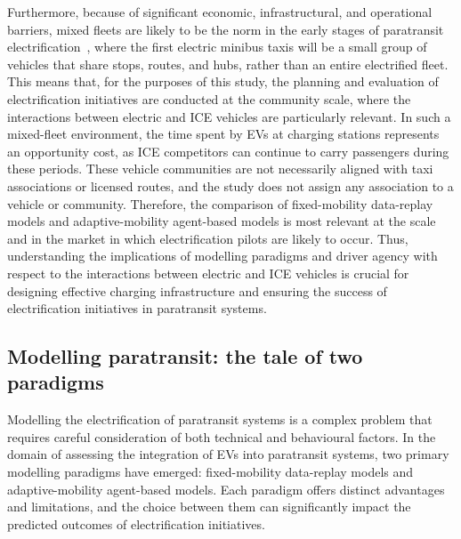 \documentclass{elsarticle}
\begin{document}
Furthermore, because of significant economic, infrastructural, and operational barriers, mixed fleets are likely to be the norm in the early stages of paratransit electrification~\cite{pretorius2024_scheduling_mixed_fleets}, where the first electric minibus taxis will be a small group of vehicles that share stops, routes, and hubs, rather than an entire electrified fleet. This means that, for the purposes of this study, the planning and evaluation of electrification initiatives are conducted at the community scale, where the interactions between electric and ICE vehicles are particularly relevant. In such a mixed-fleet environment, the time spent by EVs at charging stations represents an opportunity cost, as ICE competitors can continue to carry passengers during these periods. These vehicle communities are not necessarily aligned with taxi associations or licensed routes, and the study does not assign any association to a vehicle or community. Therefore, the comparison of fixed-mobility data-replay models and adaptive-mobility agent-based models is most relevant at the scale and in the market in which electrification pilots are likely to occur. Thus, understanding the implications of modelling paradigms and driver agency with respect to the interactions between electric and ICE vehicles is crucial for designing effective charging infrastructure and ensuring the success of electrification initiatives in paratransit systems.


\subsection{Modelling paratransit: the tale of two paradigms}

Modelling the electrification of paratransit systems is a complex problem that requires careful consideration of both technical and behavioural factors. In the domain of assessing the integration of EVs into paratransit systems, two primary modelling paradigms have emerged: fixed-mobility data-replay models and adaptive-mobility agent-based models. Each paradigm offers distinct advantages and limitations, and the choice between them can significantly impact the predicted outcomes of electrification initiatives. 
\end{document}
